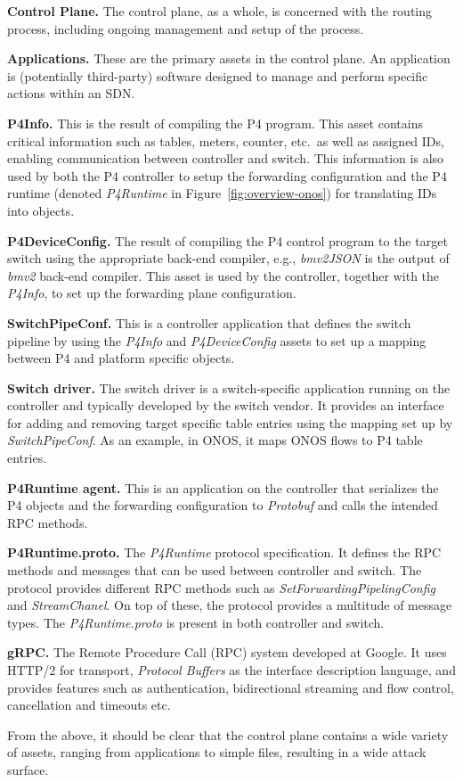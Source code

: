 \documentclass[10pt,sigconf]{acmart}
\newenvironment{mydesc}{\par}{\par}
\newcommand{\myitem}[1][*]{\par\textbf{#1}}
\begin{document}
\noindent\textbf{Control Plane.}
The control plane, as a whole, is concerned with the routing process,
including ongoing management and setup of the process.

\begin{mydesc}
\myitem[Applications.] These are the primary assets in the control
  plane. An application is (potentially third-party) software designed
  to manage and perform specific actions within an SDN.
\myitem[P4Info.] This is the result of compiling the P4 program. This
  asset contains critical information such as tables, meters, counter,
  etc.\ as well as assigned IDs, enabling communication between
  controller and switch. This information is also used by both the P4
  controller to setup the forwarding configuration and the P4 runtime
  (denoted \emph{P4Runtime} in Figure~\ref{fig:overview-onos}) for
  translating IDs into objects.
\myitem[P4DeviceConfig.] The result of compiling the P4 control program
  to the target switch using the appropriate back-end compiler, e.g.,
  \emph{bmv2JSON} is the output of \emph{bmv2} back-end compiler. This
  asset is used by the controller, together with the \emph{P4Info}, to
  set up the forwarding plane configuration.
\myitem[SwitchPipeConf.] This is a controller application that defines
  the switch pipeline by using the \emph{P4Info} and
  \emph{P4DeviceConfig} assets to set up a mapping between P4 and
  platform specific objects.
\myitem[Switch driver.] The switch driver is a switch-specific
  application running on the controller and typically developed by the
  switch vendor. It provides an interface for adding and removing
  target specific table entries using the mapping set up by
  \emph{SwitchPipeConf}. As an example, in ONOS, it maps ONOS flows to
  P4 table entries.
\myitem[P4Runtime agent.] This is an application on the controller that
  serializes the P4 objects and the forwarding configuration to
  \emph{Protobuf} and calls the intended RPC methods.
\myitem[P4Runtime.proto.] The \emph{P4Runtime} protocol specification.
  It defines the RPC methods and messages that can be used between
  controller and switch. The protocol provides different RPC methods
  such as \emph{SetForwardingPipelingConfig} and \emph{StreamChanel}.
  On top of these, the protocol provides a multitude of message types.
  The \emph{P4Runtime.proto} is present in both controller and switch.
\myitem[gRPC.] The Remote Procedure Call (RPC) system developed at
  Google. It uses HTTP/2 for transport, \emph{Protocol Buffers} as the
  interface description language, and provides features such as
  authentication, bidirectional streaming and flow control,
  cancellation and timeouts etc.
\end{mydesc}
From the above, it should be clear that the control plane contains a
wide variety of assets, ranging from applications to simple files,
resulting in a wide attack surface.
\end{document}
